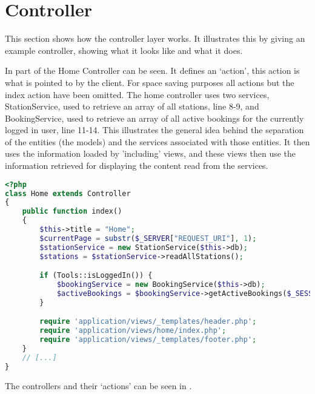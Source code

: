 \section{Controller}
This section shows how the controller layer works. 
It illustrates this by giving an example controller, showing what it looks like and what it does.

In  part of the Home Controller can be seen. 
It defines an `action', this action is what is pointed to by the client. 
For space saving purposes all actions but the index action have been omitted.
The home controller uses two services, StationService, used to retrieve an array of all stations, line 8-9, and BookingService, used to retrieve an array of all active bookings for the currently logged in user, line 11-14. 
This illustrates the general idea behind the separation of the entities (the models) and the services associated with those entities.
It then uses the information loaded by 'including' views, and these views then use the information retrieved for displaying the content read from the services.

\begin{lstlisting}[language=php, label=lst:homeController, caption={Home Controller Class}]
<?php
class Home extends Controller
{
    public function index()
    {
        $this->title = "Home";
        $currentPage = substr($_SERVER["REQUEST_URI"], 1);
        $stationService = new StationService($this->db);
        $stations = $stationService->readAllStations();

        if (Tools::isLoggedIn()) {
            $bookingService = new BookingService($this->db);
            $activeBookings = $bookingService->getActiveBookings($_SESSION["login_user"]);
        }

        require 'application/views/_templates/header.php';
        require 'application/views/home/index.php';
        require 'application/views/_templates/footer.php';
    }
    // [...]
}
\end{lstlisting}

The controllers and their `actions' can be seen in .